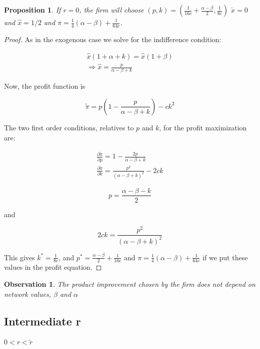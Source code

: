 \documentclass[12pt]{report}
\newtheorem{proposition}{Proposition}
\newtheorem{observation}{Observation}
\numberwithin{equation}{section}
\begin{document}
\begin{proposition}
If $r=0$, the firm will choose $(p,k)=(\frac{1}{16c}+\frac{\alpha-\beta}{2},\frac{1}{8c})$ $\check{x}=0$ and $\hat{x}=1/2$ and $\pi= \frac{1}{4}(\alpha-\beta)+\frac{1}{64c}$.
\end{proposition}

\begin{proof}


As in the exogenous case we solve for the indifference condition:

\begin{align*}
\hat{x}(1+\alpha+k)=\hat{x}(1+\beta) \\
\Rightarrow \hat{x} = \frac{p}{\alpha - \beta +k}
\end{align*}


Now, the profit function is

\begin{equation*}
\tilde{\pi} = p\left(1-\frac{p}{\alpha - \beta +k}\right)-c k^2
\end{equation*}

The two first order conditions, relatives to $p$ and $k$, for the profit maximization are:

\begin{align*}
\frac{\partial \tilde{\pi}}{\partial p}= 1-\frac{2p}{\alpha - \beta +k}\\
\frac{\partial \tilde{\pi}}{\partial k}=  \frac{p^2}{(\alpha-\beta+k)^2}-2ck 
\end{align*} 

\begin{equation*}
p = \frac{\alpha-\beta-k}{2}
\end{equation*}

and 

\begin{equation*}
2ck = \frac{p^2}{(\alpha-\beta+k)^2}
\end{equation*}

This gives $k^*=\frac{1}{8c}$,  and $p^*=\frac{\alpha-\beta}{2}+\frac{1}{16c}$ and $\pi=\frac{1}{4}(\alpha-\beta)+\frac{1}{64c} $ if we put these values in the profit equation. 

\end{proof}

\begin{observation}
The product improvement chosen by the firm does not depend on network values, $\beta$ and $\alpha$
\end{observation}


\subsection{Intermediate r}
$0<r<\tilde{r}$
\end{document}
